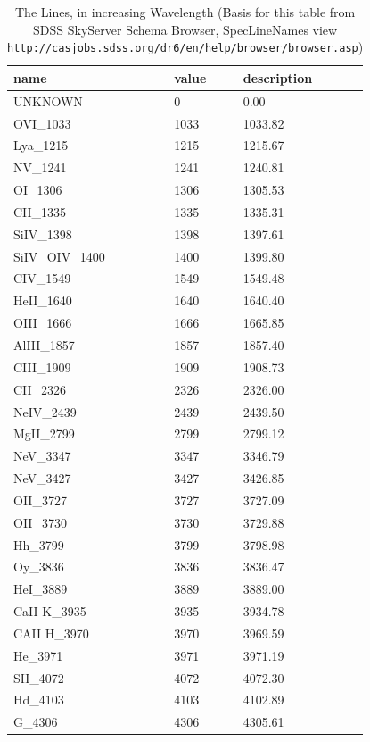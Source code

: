 \documentclass[11pt]{article}
\begin{document}
\begin{table}
  \caption{The Lines, in increasing Wavelength (Basis for this table from 
  SDSS SkyServer Schema Browser, SpecLineNames view {\tt http://casjobs.sdss.org/dr6/en/help/browser/browser.asp}) }
  \label{tab:the_lines}
  \begin{center}
    \begin{tabular}{lll} 
      \hline
      \hline
name &	value &	description \\
      \hline
UNKNOWN	   &    0    & 	0.00 \\
OVI\_1033   &	1033 &	1033.82 \\
Lya\_1215   &	1215 &	1215.67 \\
NV\_1241    &   1241 &	1240.81 \\
OI\_1306    &   1306 &	1305.53 \\
CII\_1335   &	1335 &	1335.31 \\
SiIV\_1398  &	1398 &	1397.61 \\
SiIV\_OIV\_1400 & 1400 &  1399.80 \\
CIV\_1549   &   1549 &	1549.48 \\
HeII\_1640  &	1640 &	1640.40 \\
OIII\_1666  &	1666 &	1665.85 \\
AlIII\_1857 &	1857 &	1857.40 \\
CIII\_1909  &	1909 &	1908.73 \\
CII\_2326   &	2326 &	2326.00 \\
NeIV\_2439  &	2439 &	2439.50 \\
MgII\_2799  &	2799 &	2799.12 \\
NeV\_3347   &	3347 &	3346.79 \\
NeV\_3427   &	3427 &	3426.85 \\
OII\_3727   &	3727 &  3727.09 \\
OII\_3730   &	3730 &	3729.88 \\
Hh\_3799    &   3799 &  3798.98 \\
Oy\_3836    &   3836 &	3836.47 \\
HeI\_3889   &	3889 &	3889.00 \\
CaII K\_3935 &  3935 &	3934.78 \\
CAII H\_3970 &  3970 &	3969.59 \\
He\_3971    &   3971 &	3971.19 \\
SII\_4072   &	4072 &	4072.30 \\
Hd\_4103    &   4103 &	4102.89 \\
G\_4306	    &   4306 &	4305.61 \\

\end{tabular}
\end{center}
\end{table}
\end{document}
